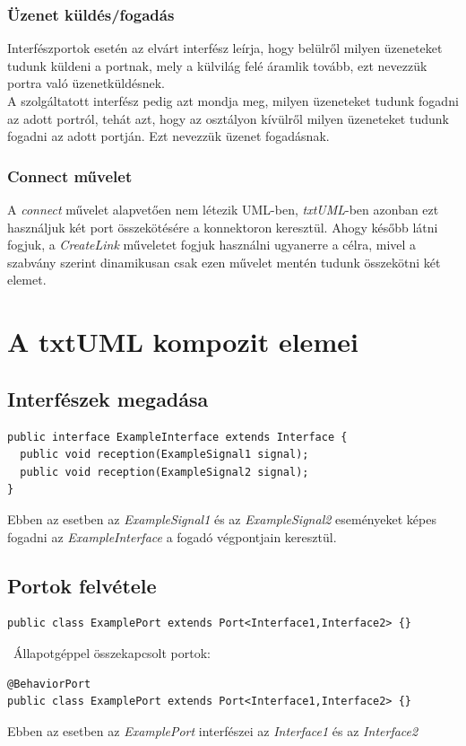 \documentclass[a4paper,12pt]{report}
\begin{document}
\subsubsection{Üzenet küldés/fogadás}
Interfészportok esetén az elvárt interfész leírja, hogy belülről milyen üzeneteket tudunk küldeni a portnak, mely a külvilág felé áramlik tovább, ezt nevezzük portra való üzenetküldésnek. \\ A szolgáltatott interfész pedig azt mondja meg, milyen üzeneteket tudunk fogadni az adott portról, tehát azt, hogy az osztályon kívülről milyen üzeneteket tudunk fogadni az adott portján. Ezt nevezzük üzenet fogadásnak.
\subsubsection{Connect művelet}
A \textit{connect} művelet alapvetően nem létezik UML-ben, \textit{txtUML}-ben azonban ezt használjuk két port összekötésére a konnektoron keresztül. Ahogy később látni fogjuk, a \textit{CreateLink} műveletet fogjuk használni ugyanerre a célra, mivel a szabvány szerint dinamikusan csak ezen művelet mentén tudunk összekötni két elemet.

\section{A txtUML kompozit elemei}
\subsection{Interfészek megadása}
\begin{lstlisting}
public interface ExampleInterface extends Interface {
  public void reception(ExampleSignal1 signal);
  public void reception(ExampleSignal2 signal);
}
\end{lstlisting}
Ebben az esetben az \textit{ExampleSignal1} és az \textit{ExampleSignal2} eseményeket képes fogadni az \textit{ExampleInterface} a fogadó végpontjain keresztül.
 
\subsection{Portok felvétele}
\begin{lstlisting}
public class ExamplePort extends Port<Interface1,Interface2> {}
\end{lstlisting}
\
Állapotgéppel összekapcsolt portok:
\begin{lstlisting}
@BehaviorPort
public class ExamplePort extends Port<Interface1,Interface2> {}
\end{lstlisting}
Ebben az esetben az \textit{ExamplePort} interfészei az \textit{Interface1} és az \textit{Interface2}
\end{document}
